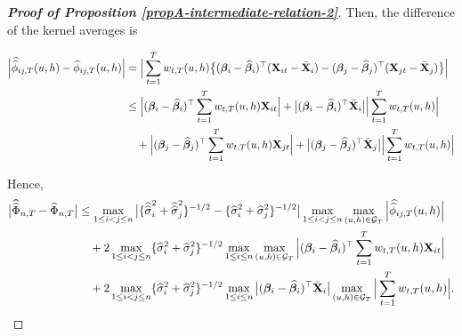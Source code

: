 \documentclass[a4paper,12pt]{article}
\newcommand{\doublehat}[1]{\skew{5.5}\widehat{\widehat{#1}}}
\newcommand{\doublehattwo}[1]{\widehat{\widehat{#1}}}
\begin{document}
\begin{proof}[\textnormal{\textbf{Proof of Proposition \ref{propA-intermediate-relation-2}}}]


Then, the difference of the kernel averages is
\begin{small}\begin{align*}
\Big| \doublehat{\phi}_{ij, T}(u,h) - \widehat{\phi}_{ij, T}(u,h) \Big|  &=\Big| \sum_{t=1}^T w_{t,T}(u,h) \big\{ (\bm{\beta}_i - \widehat{\bm{\beta}}_i)^\top (\mathbf{X}_{it} - \bar{\mathbf{X}}_{i}) - (\bm{\beta}_j - \widehat{\bm{\beta}}_j)^\top (\mathbf{X}_{jt} - \bar{\mathbf{X}}_{j}) \big\} \Big| \\
 &\le \Big|(\bm{\beta}_i - \widehat{\bm{\beta}}_i)^\top \sum_{t=1}^T w_{t,T}(u,h) \mathbf{X}_{it} \Big| +  \big|(\bm{\beta}_i - \widehat{\bm{\beta}}_i)^\top\bar{\mathbf{X}}_{i}\big| \Big| \sum_{t=1}^T w_{t,T}(u,h)  \Big| \\
&\quad +\Big|(\bm{\beta}_j - \widehat{\bm{\beta}}_j)^\top \sum_{t=1}^T w_{t,T}(u,h) \mathbf{X}_{jt}  \Big| + \big|(\bm{\beta}_j - \widehat{\bm{\beta}}_j)^\top\bar{\mathbf{X}}_{j}\big| \Big| \sum_{t=1}^T w_{t,T}(u,h)  \Big| 
\end{align*}
\end{small}

Hence,
\begin{align}\label{ineq-diff-1}
\begin{split}
\big| \doublehattwo{\Phi}_{n, T} - \widehat{\Phi}_{n, T} \big|& \le  \max_{1 \le i < j \le n} \big|\{\doublehattwo{\sigma}_i^2 + \doublehattwo{\sigma}_j^2 \}^{-1/2} - \{\widehat{\sigma}_i^2 + \widehat{\sigma}_j^2 \}^{-1/2}\big|\max_{1 \le i< j \le n} \max_{(u,h) \in \mathcal{G}_T} \Big|\doublehat{\phi}_{ij,T}(u,h)\Big| \\
&\quad+ 2\max_{1\le i < j \le n} \{\widehat{\sigma}_i^2+ \widehat{\sigma}_j^2 \}^{-1/2} \max_{1 \le i \le n} \max_{(u,h) \in \mathcal{G}_T} \Big| (\bm{\beta}_i - \widehat{\bm{\beta}}_i)^\top\sum_{t=1}^T w_{t,T}(u,h) \mathbf{X}_{it} \Big| \\
&\quad+ 2\max_{1\le i < j \le n} \{\widehat{\sigma}_i^2+ \widehat{\sigma}_j^2 \}^{-1/2}\max_{1 \le i \le n}\big|(\bm{\beta}_i - \widehat{\bm{\beta}}_i)^\top\bar{\mathbf{X}}_{i}\big| \max_{(u,h) \in \mathcal{G}_T}  \Big| \sum_{t=1}^T w_{t,T}(u,h)  \Big|.
\end{split}
\end{align}


\end{proof}
\end{document}
